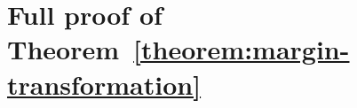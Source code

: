 \section{Full proof of Theorem~\ref{theorem:margin-transformation}}
\label{section:full-proof-of-theorem-margin-transformation}



